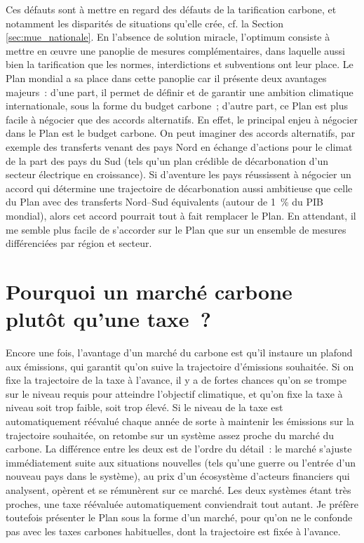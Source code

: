 \documentclass[a5paper,french]{memoir}
\begin{document}
Ces défauts sont à mettre en regard des défauts de la tarification carbone, et notamment les disparités de situations qu'elle crée, cf. la Section \ref{sec:mue_nationale}. En l'absence de solution miracle, l'optimum consiste à mettre en œuvre une panoplie de mesures complémentaires, dans laquelle aussi bien la tarification que les normes, interdictions et subventions ont leur place. Le Plan mondial a sa place dans cette panoplie car il présente deux avantages majeurs~: d'une part, il permet de définir et de garantir une ambition climatique internationale, sous la forme du budget carbone~; d'autre part, ce Plan est plus facile à négocier que des accords alternatifs. En effet, le principal enjeu à négocier dans le Plan est le budget carbone. On peut imaginer des accords alternatifs, par exemple des transferts venant des pays Nord en échange d'actions pour le climat de la part des pays du Sud (tels qu'un plan crédible de décarbonation d'un secteur électrique en croissance). Si d'aventure les pays réussissent à négocier un accord qui détermine une trajectoire de décarbonation aussi ambitieuse que celle du Plan avec des transferts Nord--Sud équivalents (autour de 1~\% du PIB mondial), alors cet accord pourrait tout à fait remplacer le Plan. En attendant, il me semble plus facile de s'accorder sur le Plan que sur un ensemble de mesures différenciées par région et secteur.


\section*{\normalsize Pourquoi un marché carbone plutôt qu'une taxe~?}\label{q:taxe}

Encore une fois, l'avantage d'un marché du carbone est qu'il instaure un plafond aux émissions, qui garantit qu'on suive la trajectoire d'émissions souhaitée. Si on fixe la trajectoire de la taxe à l'avance, il y a de fortes chances qu'on se trompe sur le niveau requis pour atteindre l'objectif climatique, et qu'on fixe la taxe à niveau soit trop faible, soit trop élevé. Si le niveau de la taxe est automatiquement réévalué chaque année de sorte à maintenir les émissions sur la trajectoire souhaitée, on retombe sur un système assez proche du marché du carbone. La différence entre les deux est de l'ordre du détail~: le marché s'ajuste immédiatement suite aux situations nouvelles (tels qu'une guerre ou l'entrée d'un nouveau pays dans le système), au prix d'un écosystème d'acteurs financiers qui analysent, opèrent et se rémunèrent sur ce marché. Les deux systèmes étant très proches, une taxe réévaluée automatiquement conviendrait tout autant. Je préfère toutefois présenter le Plan sous la forme d'un marché, pour qu'on ne le confonde pas avec les taxes carbones habituelles, dont la trajectoire est fixée à l'avance. 
\end{document}
